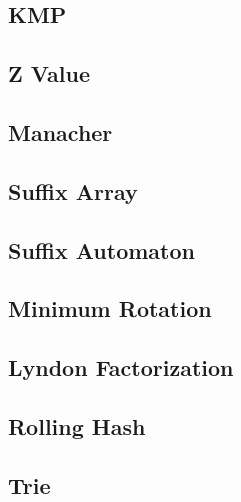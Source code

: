 \documentclass[a4paper,10pt,twocolumn,oneside,x11names]{article}
\begin{document}
\subsection{KMP}


\subsection{Z Value}


\subsection{Manacher}


\subsection{Suffix Array}



\subsection{Suffix Automaton}


%

\subsection{Minimum Rotation}


\subsection{Lyndon Factorization}


\subsection{Rolling Hash}


\subsection{Trie}

\end{document}
